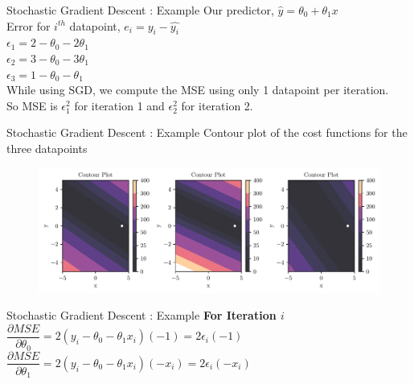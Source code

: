 \documentclass[usenames,dvipsnames]{beamer}
\begin{document}
                        \begin{frame}{Stochastic Gradient Descent : Example}
                        Our predictor, $\hat{y} = \theta_0 + \theta_1x$\\
                        \vspace{1cm}
                        Error for $i^{th}$ datapoint, $e_i = y_i - \hat{y_i}$\\
                        
                        $\epsilon_1 = 2 - \theta_0 - 2\theta_1$ \\
                        $\epsilon_2 = 3 - \theta_0 - 3\theta_1$ \\
                        $\epsilon_3 = 1 - \theta_0 - \theta_1$ \\
                        
                        \vspace{1cm}
                        While using SGD, we compute the MSE using only 1 datapoint per iteration. \\
                        So MSE is $\epsilon_1^2$ for iteration 1 and $\epsilon_2^2$ for iteration 2.
                        \end{frame}

                        \begin{frame}{Stochastic Gradient Descent : Example}
                            Contour plot of the cost functions for the three datapoints
                            \begin{figure}
                                \includegraphics[scale=0.5]{../figures/mml/gradient-descent-3-functions.pdf}
                            \end{figure}
                        \end{frame}
                        
                        
                        \begin{frame}{Stochastic Gradient Descent : Example}
                        \textbf{For Iteration $i$}\\
                        \vspace{1cm}
                        $\dfrac{\partial MSE}{\partial \theta_0} = 2\left( y_i - \theta_0 -\theta_1x_i \right)\left(-1\right) = 2\epsilon_i\left(-1\right)$ \\
                        \vspace{2cm}
                        $\dfrac{\partial MSE}{\partial \theta_1} = 2\left( y_i - \theta_0 -\theta_1x_i \right)\left(-x_i\right) = 2\epsilon_i\left(-x_i\right)$ 
                        \end{frame}
                        
\end{document}
